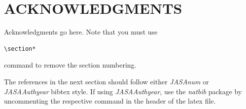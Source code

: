 \documentclass[a4paper,10pt]{ica2013_2}
\begin{document}
\section*{ACKNOWLEDGMENTS}
Acknowledgments go here. Note that you must use \begin{verbatim}\section*\end{verbatim} command to remove the section numbering.

The references in the next section should follow either \textit{JASAnum} or \textit{JASAAuthyear} bibtex style. If using \textit{JASAAuthyear}, use the \textit{natbib} package by uncommenting the respective command in the header of the  latex file.
%



\end{document}
